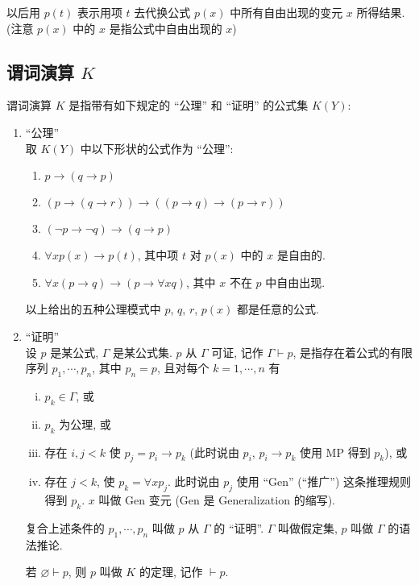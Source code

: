 \documentclass[
    mode=hazy,
    color=blue,
    device=normal,
    lang=cn
]{elegantnote}
\begin{document}
        以后用 $p(t)$ 表示用项 $t$ 去代换公式 $p(x)$ 中所有自由出现的变元 $x$ 所得结果. (注意 $p(x)$ 中的 $x$ 是指公式中自由出现的 $x$)

        \subsection{谓词演算 \texorpdfstring{$K$}{K}}
        \begin{definition}[谓词演算 $K$]
            谓词演算 $K$ 是指带有如下规定的 ``公理'' 和 ``证明'' 的公式集 $K(Y)$:
            \begin{enumerate}[label = $\arabic*^\circ$]
                \item ``公理''\\
                取 $K(Y)$ 中以下形状的公式作为 ``公理'':
                \begin{enumerate}[label = (K\arabic*)]
                    \item $p\to (q\to p)$
                    \item $(p\to (q\to r))\to ((p\to q)\to (p\to r))$
                    \item $(\lnot p\to \lnot q)\to (q\to p)$
                    \item $\forall xp(x)\to p(t)$, 其中项 $t$ 对 $p(x)$ 中的 $x$ 是自由的.
                    \item $\forall x(p\to q)\to (p\to \forall xq)$, 其中 $x$ 不在 $p$ 中自由出现.
                \end{enumerate}
                以上给出的五种公理模式中 $p$, $q$, $r$, $p(x)$ 都是任意的公式.
                \item ``证明''\\
                设 $p$ 是某公式, $\Gamma$ 是某公式集. $p$ 从 $\Gamma$ 可证, 记作 $\Gamma\vdash p$, 是指存在着公式的有限序列 $p_1, \cdots, p_n$, 其中 $p_n = p$, 且对每个 $k=1, \cdots, n$ 有
                \begin{enumerate}[(i)]
                    \item $p_k\in \Gamma$, 或
                    \item $p_k$ 为公理, 或
                    \item 存在 $i, j <k$ 使 $p_j=p_i\to p_k$ (此时说由 $p_i$, $p_i\to p_k$ 使用 MP 得到 $p_k$), 或
                    \item 存在 $j<k$, 使 $p_k = \forall xp_j$. 此时说由 $p_j$ 使用 ``Gen'' (``推广'') 这条推理规则得到 $p_k$. $x$ 叫做 Gen 变元 (Gen 是 Generalization 的缩写).
                \end{enumerate}
                复合上述条件的 $p_1, \cdots, p_n$ 叫做 $p$ 从 $\Gamma$ 的 ``证明''. $\Gamma$ 叫做假定集, $p$ 叫做 $\Gamma$ 的语法推论.

                若 $\varnothing\vdash p$, 则 $p$ 叫做 $K$ 的定理, 记作 $\vdash p$.
            \end{enumerate}
        \end{definition}
\end{document}
